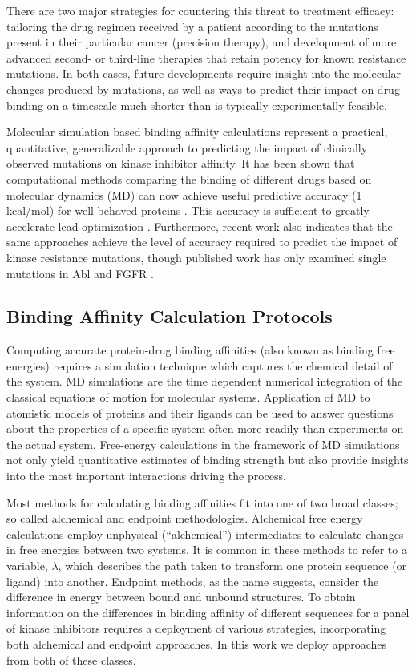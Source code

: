 \documentclass[conference]{IEEEtran}
\begin{document}
There are two major strategies for countering this threat to treatment efficacy: tailoring the drug regimen received by a patient according to the mutations present in their particular cancer (precision therapy), and development of more advanced second- or third-line therapies that retain potency for known resistance mutations. In both cases, future developments require insight into the molecular changes produced by mutations, as well as ways to predict their impact on drug binding on a timescale much shorter than is typically experimentally feasible.

Molecular simulation based binding affinity calculations represent a practical, quantitative, generalizable approach to predicting the impact of clinically observed mutations on kinase inhibitor affinity. It has been shown that computational methods comparing the binding of different drugs based on molecular dynamics (MD) can now achieve useful predictive accuracy (1 kcal/mol) for well-behaved proteins \cite{shirts-mobley-chodera:2007:annu-rep-comput-chem:prime-time, abel:jacs:2015:fep-plus}. This accuracy is sufficient to greatly accelerate lead optimization \cite{shirts-mobley-brown:2009:sbdd}. Furthermore, recent work also indicates that the same approaches achieve the level of accuracy required to predict the impact of kinase resistance mutations, though published work has only examined single mutations in Abl and FGFR \cite{mondal:jacs:2016:imatinib-gatekeeper,  Bunney2015}.

\subsection{Binding Affinity Calculation Protocols}\label{sec:bac}

Computing accurate protein-drug binding affinities (also known as binding free energies) requires a simulation technique which captures the chemical detail of the system. MD simulations are the time dependent numerical integration of the classical equations of motion for molecular systems. Application of MD to atomistic models of proteins and their ligands can be used to answer questions about the properties of a specific system often more readily than experiments on the actual system. Free-energy calculations in the framework of MD simulations not only yield quantitative estimates of binding strength but also provide insights into the most important interactions driving the process.

Most methods for calculating binding affinities fit into one of two broad classes; so called alchemical and endpoint methodologies. Alchemical free energy calculations employ unphysical (“alchemical”) intermediates to calculate changes in free energies between two systems. It is common in these methods to refer to a variable, $\lambda$, which describes the path taken to transform one protein sequence (or ligand) into another. Endpoint methods, as the name suggests, consider the difference in energy between bound and unbound structures. To obtain information on the differences in binding affinity of different sequences for a panel of kinase inhibitors requires a deployment of various strategies, incorporating both alchemical and endpoint approaches. In this work we deploy approaches from both of these classes.
\end{document}
